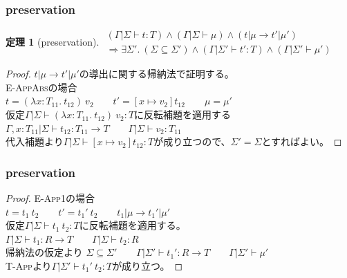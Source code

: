\documentclass[dvipdfmx,cjk,xcolor=dvipsnames,envcountsect,notheorems]{beamer}
\theoremstyle{definition}
\newtheorem{theorem}{定理}
\begin{document}
\begin{frame}
	\frametitle{preservation}
	\Large
	\renewcommand{\thetheorem}{13.5.3}
	\begin{theorem}[preservation]
		$
			\begin{array}{c}
				(\Gamma | \Sigma \vdash t : T) \land (\Gamma | \Sigma \vdash \mu) \land (t | \mu \rightarrow t' | \mu')\\
				\Rightarrow \exists \Sigma'.~(\Sigma \subseteq \Sigma') \land (\Gamma | \Sigma' \vdash t' : T) \land (\Gamma | \Sigma' \vdash \mu')
			\end{array}
		$
	\end{theorem}
	\begin{proof}
		$t | \mu \rightarrow t' | \mu'$の導出に関する帰納法で証明する。\\
		\textsc{E-AppAbs}の場合\\
		$t = (\lambda x : T_{11}.~t_{12})~v_2 \qquad t' = [x \mapsto v_2]t_{12} \qquad \mu = \mu'$\\
		仮定$\Gamma|\Sigma \vdash (\lambda x : T_{11}.~t_{12})~v_2 : T$に反転補題を適用する\\
		$\Gamma, x : T_{11} | \Sigma \vdash t_{12} : T_{11} \rightarrow T \qquad \Gamma | \Sigma \vdash v_2 : T_{11}$\\
		代入補題より$\Gamma | \Sigma \vdash [x \mapsto v_2]t_{12} : T$が成り立つので、$\Sigma' = \Sigma$とすればよい。
	\end{proof}
\end{frame}

\begin{frame}
	\frametitle{preservation}
	\Large
	\begin{proof}
		\textsc{E-App1}の場合\\
		$t = t_1~t_2 \qquad t' = t_1'~t_2 \qquad t_1|\mu \rightarrow t_1' |\mu'$\\
		仮定$\Gamma | \Sigma \vdash t_1~t_2 : T$に反転補題を適用する。\\
		$\Gamma | \Sigma \vdash t_1 : R \rightarrow T \qquad \Gamma | \Sigma \vdash t_2 : R$\\
		帰納法の仮定より
		$\Sigma \subseteq \Sigma' \qquad \Gamma | \Sigma' \vdash t_1' : R \rightarrow T \qquad \Gamma | \Sigma' \vdash \mu'$\\
		\textsc{T-App}より$\Gamma | \Sigma' \vdash t_1'~t_2 : T$が成り立つ。
	\end{proof}
\end{frame}
\end{document}
